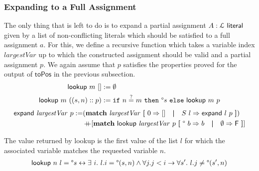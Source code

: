 \documentclass[a4paper,UKenglish,cleveref, autoref]{lipics-v2019}
\begin{document}
\subsubsection{Expanding to a Full Assignment}
The only thing that is left to do is to expand a partial assignment $A : \mathcal{L}~{\textsf{literal}}$ given by a list of non-conflicting literals which should be satisfied to a full assignment $a$. For this, we define a recursive function which takes a variable index $\mathit{largestVar}$ up to which the constructed assignment should be valid and a partial assignment $p$. We again assume that $p$ satisfies the properties proved for the output of $\textsf{toPos}$ in the previous subsection.
\begin{align*}
  \textsf{lookup}~m~[] &:= \emptyset \\
  \textsf{lookup}~m~((s, n)::p) &:= \texttt{if}~{n\overset{?}{=}m}~\texttt{then}~{\degree s}~\texttt{else}~{\textsf{lookup}~m~p} 
\end{align*}
\begin{align*}
  \textsf{expand}~\mathit{largestVar}~p := &(\textbf{match}~ \mathit{largestVar} ~\textbf{[}~ 0 \Rightarrow [] \quad\textbf{|}\quad S~l \Rightarrow \textsf{expand}~l~p ~\textbf{]}) \\
  &\mathop{{+}\!\!\!{+}} [\textbf{match}~ \textsf{lookup}~\mathit{largestVar}~p ~\textbf{[}~ \degree~b \Rightarrow b \quad\textbf{|}\quad \emptyset \Rightarrow \mathsf{F} ~\textbf{]}]
\end{align*}

\begin{proposition}
  The value returned by \normalfont\textsf{lookup} is the first value of the list $l$ for which the associated variable matches the requested variable $n$.
  \begin{align*}
    \normalfont\textsf{lookup}~n~l = \degree s \leftrightarrow \exists~i.~l.i = \degree(s, n) \land \forall j. j < i \rightarrow \forall s'.~l.j \neq \degree(s', n)
  \end{align*}
\end{proposition}
\end{document}
